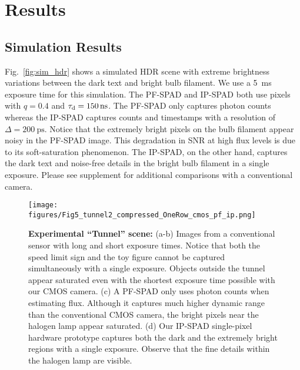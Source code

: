 \section{Results}
\subsection{Simulation Results}
Fig.~\ref{fig:sim_hdr} shows a simulated HDR scene with extreme brightness
variations between the dark text and bright bulb filament. We use a \SI{5}{\ms}
exposure time for this simulation. The PF-SPAD and
IP-SPAD both use pixels with $q=0.4$ and $\taud=\SI{150}{\ns}$.
The PF-SPAD only captures photon
counts whereas the IP-SPAD captures counts and timestamps with a resolution
of $\Delta=\SI{200}{\ps}$. Notice that the extremely bright pixels on the bulb
filament appear noisy in the PF-SPAD image. This degradation in SNR at high
flux levels is due to its soft-saturation phenomenon. The IP-SPAD, on the other
hand, captures the dark text and noise-free details in the bright bulb filament
in a single exposure. Please see supplement for additional comparisons with a
conventional camera.


\begin{figure*}[!ht]
  \centering \texttt{[image: figures/Fig5\_tunnel2\_compressed\_OneRow\_cmos\_pf\_ip.png]}
  \caption{\textbf{Experimental ``Tunnel'' scene:}  (a-b) Images from a
  conventional sensor with long and short exposure times. Notice that both the speed
  limit sign and the toy figure cannot be captured simultaneously with a single
	exposure. Objects outside the tunnel appear saturated even with the
	shortest exposure time possible with our CMOS camera. (c) A PF-SPAD
  \cite{ingle2019high} only uses photon counts when estimating flux.
  Although it captures much higher dynamic range than the
  conventional CMOS camera, the bright pixels near the halogen lamp 
  appear saturated. (d) Our IP-SPAD single-pixel hardware prototype
  captures both the dark and the extremely bright regions with a single
  exposure. Observe that the fine details within the halogen
  lamp are visible. \label{fig:tunnel}}
  \vspace{-0.15in}
\end{figure*}


